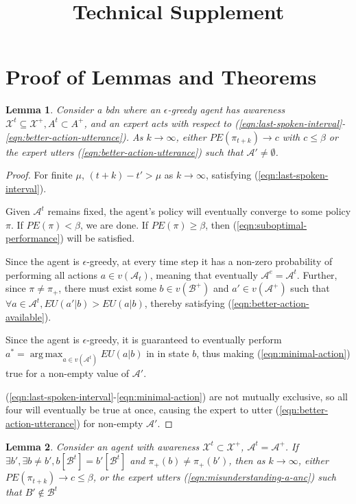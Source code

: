 \documentclass{article}
\DeclareMathOperator*{\argmax}{arg\,max}
\newcommand{\bdn}{{\sc bdn}}
\newtheorem{lemma}{Lemma}
\begin{document}
	\title{Technical Supplement}
	\date{}
	\maketitle
	
	\section{Proof of Lemmas and Theorems}
		\begin{lemma}
			Consider a \bdn{} where an $\epsilon$-greedy agent has awareness $\mathcal{X}^t \subseteq \mathcal{X}^+, A^t \subset A^+$, and an expert acts with respect to (\ref{eqn:last-spoken-interval}-\ref{eqn:better-action-utterance}). As $k \rightarrow \infty$, either $PE(\pi_{t+k}) \rightarrow c$ with $c \leq \beta$ or the expert utters (\ref{eqn:better-action-utterance}) such that $\mathcal{A}' \neq \emptyset$.
		\end{lemma}
		\begin{proof}
			For finite $\mu$, $(t+k) - t' > \mu$ as $k \rightarrow \infty$, satisfying (\ref{eqn:last-spoken-interval}). 
			
			Given $\mathcal{A}^t$ remains fixed, the agent's policy will eventually converge to some policy $\pi$. If $PE(\pi) < \beta$, we are done. If $PE(\pi) \geq \beta$, then (\ref{eqn:suboptimal-performance}) will be satisfied.
			
			Since the agent is $\epsilon$-greedy, at every time step it has a non-zero probability of performing all actions $a \in v(\mathcal{A}_t)$, meaning that eventually $\mathcal{A}^e = \mathcal{A}^t$. Further, since $\pi \neq \pi_+$, there must exist some $b \in v(\mathcal{B}^+)$ and $a' \in v(\mathcal{A}^+)$ such that $\forall a \in \mathcal{A}^t, EU(a' | b) > EU(a | b)$, thereby satisfying (\ref{eqn:better-action-available}).
			
			Since the agent is $\epsilon$-greedy, it is guaranteed to eventually perform $a^* = \argmax_{a \in v(\mathcal{A}^t)} EU(a | b)$ in in state $b$, thus making (\ref{eqn:minimal-action}) true for a non-empty value of $\mathcal{A}'$.
			
			(\ref{eqn:last-spoken-interval}-\ref{eqn:minimal-action}) are not mutually exclusive, so all four will eventually be true at once, causing the expert to utter (\ref{eqn:better-action-utterance}) for non-empty $\mathcal{A}'$.
		\end{proof}

		\begin{lemma}
			Consider an agent with awareness $\mathcal{X}^t \subset \mathcal{X}^+$, $\mathcal{A}^t = \mathcal{A}^+$. If $\exists b', \exists b \neq b', b[\mathcal{B}^t] = b'[\mathcal{B}^t]$ and $\pi_+(b) \neq \pi_+(b')$, then as $k \rightarrow \infty$, either $PE(\pi_{t+k}) \rightarrow c \leq \beta$, or the expert utters (\ref{eqn:misunderstanding-a-anc}) such that $B' \notin \mathcal{B}^t$
		\end{lemma}
		
\end{document}
